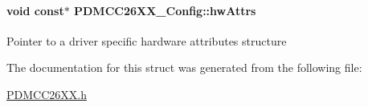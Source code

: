 \paragraph[{hw\+Attrs}]{\setlength{\rightskip}{0pt plus 5cm}void const$\ast$ P\+D\+M\+C\+C26\+X\+X\+\_\+\+Config\+::hw\+Attrs}\label{struct_p_d_m_c_c26_x_x___config_a41f103fa307fa16ee21cb639023ba934}
Pointer to a driver specific hardware attributes structure 

The documentation for this struct was generated from the following file\+:\begin{DoxyCompactItemize}
\item 
\hyperlink{_p_d_m_c_c26_x_x_8h}{P\+D\+M\+C\+C26\+X\+X.\+h}\end{DoxyCompactItemize}
